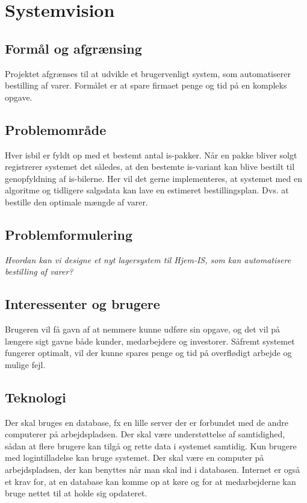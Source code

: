 \chapter{Systemvision}\label{ch:systemvision}

\section{Formål og afgrænsing}
Projektet afgrænses til at udvikle et brugervenligt system, som automatiserer bestilling af varer. 
Formålet er at spare firmaet penge og tid på en kompleks opgave.

\section{Problemområde}
Hver isbil er fyldt op med et bestemt antal is-pakker. Når en pakke bliver solgt registrerer systemet det således, at den bestemte is-variant kan blive bestilt til genopfyldning af is-bilerne. Her vil det gerne implementeres, at systemet med en algoritme og tidligere salgsdata kan lave en estimeret bestillingsplan. Dvs. at bestille den optimale mængde af varer.

\section{Problemformulering}
\textit{Hvordan kan vi designe et nyt lagersystem til Hjem-IS, som kan automatisere bestilling af varer?}

\section{Interessenter og brugere}
Brugeren vil få gavn af at nemmere kunne udføre sin opgave, og det vil på længere sigt gavne både kunder, medarbejdere og investorer. Såfremt systemet fungerer optimalt, vil der kunne spares penge og tid på overflødigt arbejde og mulige fejl.

\section{Teknologi}
Der skal bruges en database, fx en lille server der er forbundet med de andre computerer på arbejdspladsen. Der skal være understøttelse af samtidighed, sådan at flere brugere kan tilgå og rette data i systemet samtidig. Kun brugere med logintilladelse kan bruge systemet. Der skal være en computer på arbejdspladsen, der kan benyttes når man skal ind i databasen. Internet er også et krav for, at en database kan komme op at køre og for at medarbejderne kan bruge nettet til at holde sig opdateret.

